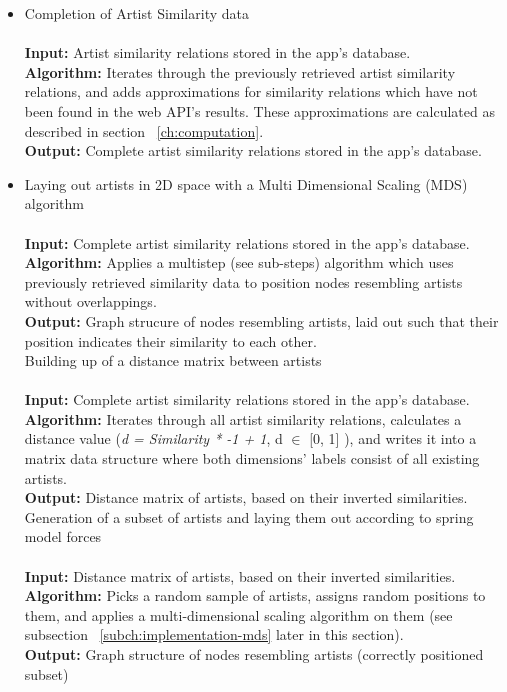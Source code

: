 \begin{itemize}
	\item Completion of Artist Similarity data \\\\
			\textbf{Input:} Artist similarity relations stored in the app's database. \\
			\textbf{Algorithm:} Iterates through the previously retrieved artist similarity relations, and
			adds approximations for similarity relations which have not been found in the web API's results.
			These approximations are calculated as described in section ~\ref{ch:computation}. \\
			\textbf{Output:} Complete artist similarity relations stored in the app's database. \\
			
	\item Laying out artists in 2D space with a Multi Dimensional Scaling (MDS) algorithm \\\\
			\textbf{Input:} Complete artist similarity relations stored in the app's database.   \\
			\textbf{Algorithm:} Applies a multistep (see sub-steps) algorithm which uses previously
			retrieved similarity data to position nodes resembling artists without overlappings.  \\
			\textbf{Output:} Graph strucure of nodes resembling artists, laid out such that their position 
			indicates their similarity to each other. \\
			
		\subitem Building up of a distance matrix between artists \\\\
				\textbf{Input:} Complete artist similarity relations stored in the app's database. \\
				\textbf{Algorithm:} Iterates through all artist similarity relations, calculates a
				distance value (\emph{d = Similarity * -1 + 1}, d $\in$ [0, 1] ), and writes it into
				a matrix data structure where both dimensions' labels consist of all existing artists. \\
				\textbf{Output:} Distance matrix of artists, based on their inverted similarities. \\
				
		\subitem Generation of a subset of artists and laying them out according to spring model forces	\\\\
				\textbf{Input:} Distance matrix of artists, based on their inverted similarities. \\
				\textbf{Algorithm:} Picks a random sample of artists, assigns random positions to them,
				and applies a multi-dimensional scaling algorithm on them (see subsection 
				~\ref{subch:implementation-mds} later in this section). \\
				\textbf{Output:} Graph structure of nodes resembling artists (correctly positioned subset) \\
				

\end{itemize}
